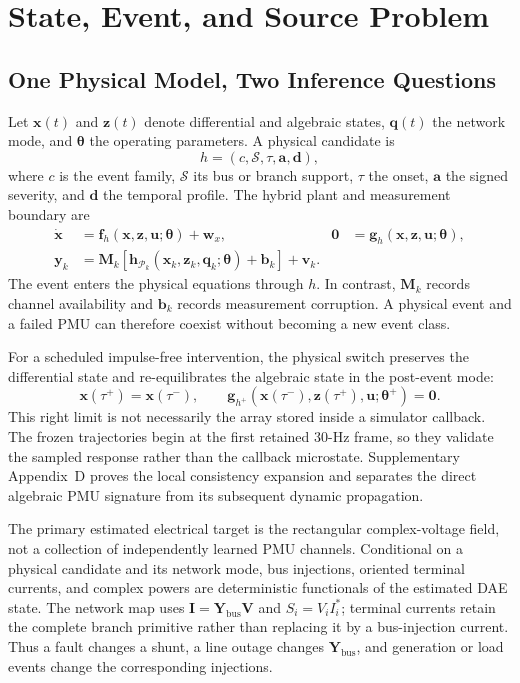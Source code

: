 \section{State, Event, and Source Problem}
\label{sec:problem-formulation}

\subsection{One Physical Model, Two Inference Questions}

Let $\bm x(t)$ and $\bm z(t)$ denote differential and algebraic states, $\bm q(t)$ the network mode, and $\bm\theta$ the operating parameters. A physical candidate is
\begin{equation}
 h=(c,\mathcal S,\tau,\bm a,\bm d),
 \label{eq:physical-hypothesis}
\end{equation}
where $c$ is the event family, $\mathcal S$ its bus or branch support, $\tau$ the onset, $\bm a$ the signed severity, and $\bm d$ the temporal profile. The hybrid plant and measurement boundary are
\begin{align}
 \dot{\bm x}&=\bm f_h(\bm x,\bm z,\bm u;\bm\theta)+\bm w_x, &
 \bm0&=\bm g_h(\bm x,\bm z,\bm u;\bm\theta), \label{eq:dae-model}\\
 \bm y_k&=\bm M_k[\bm h_{\mathcal P_k}(\bm x_k,\bm z_k,\bm q_k;\bm\theta)+\bm b_k]+\bm v_k. \label{eq:dae-measurement}
\end{align}
The event enters the physical equations through $h$. In contrast, $\bm M_k$ records channel availability and $\bm b_k$ records measurement corruption. A physical event and a failed PMU can therefore coexist without becoming a new event class.

For a scheduled impulse-free intervention, the physical switch preserves the
differential state and re-equilibrates the algebraic state in the post-event mode:
\begin{equation}
 \bm x(\tau^+)=\bm x(\tau^-),\qquad
 \bm g_{h^+}\!\left(\bm x(\tau^-),\bm z(\tau^+),\bm u;\bm\theta^+\right)=\bm0.
 \label{eq:event-right-limit}
\end{equation}
This right limit is not necessarily the array stored inside a simulator callback.
The frozen trajectories begin at the first retained 30-Hz frame, so they validate
the sampled response rather than the callback microstate. Supplementary
Appendix~D proves the local consistency expansion and separates the direct
algebraic PMU signature from its subsequent dynamic propagation.

The primary estimated electrical target is the rectangular complex-voltage field,
not a collection of independently learned PMU channels. Conditional on a
physical candidate and its network mode, bus injections, oriented terminal
currents, and complex powers are deterministic functionals of the estimated DAE
state. The network map uses $\bm I=\bm Y_{\mathrm{bus}}\bm V$ and
$S_i=V_iI_i^*$; terminal currents retain the complete branch primitive rather
than replacing it by a bus-injection current. Thus a fault changes a shunt, a
line outage changes $\bm Y_{\mathrm{bus}}$, and generation or load events change
the corresponding injections.

